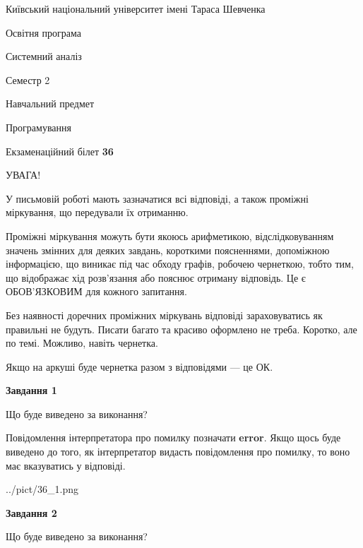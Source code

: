 \documentclass[12pt, ukrainian]{article}
\begin{document}
{{\begin {small}\par
{ \center  Київський національний університет імені Тараса Шевченка \par}
{\parbox {5 cm}{Освітня програма \hfill}{\parbox {7 cm}{Системний аналіз \hfill}}\parbox {6 cm}{\hfill Семестр 2}}\par
{\parbox {5 cm} {Навчальний предмет \hfill}\parbox {7 cm}{Програмування \hfill}\parbox {6cm}{\hfill}\par}\vspace{-7pt} \end{small}}{\center Екзаменаційний білет \No \textbf
{ 36 }\par}}
{
\begin {large}
УВАГА!

У письмовій роботі мають зазначатися всі відповіді, а також проміжні міркування, що передували їх отриманню.

Проміжні міркування можуть бути якоюсь арифметикою, відслідковуванням зна\-чень змінних для деяких завдань,
короткими поясненнями, допоміжною інформацією, що виникає під час обходу графів, робочею чернеткою,
тобто тим, що відображає хід розв’язання або пояснює отриману відповідь.
Це є ОБОВ’ЯЗКОВИМ для кожного запитання.

Без наявності доречних проміжних міркувань відповіді зараховуватись як правиль\-ні не будуть.
Писати багато та красиво оформлено не треба. Коротко, але по темі. Можли\-во, навіть чернетка.

Якщо на аркуші буде чернетка разом з відповідями --- це ОК.

\newpage

{\begin {center}\textbf{Завдання 1}\end {center}}\par
Що буде виведено за виконання?

Повідомлення інтерпретатора про помилку позначати \textbf{error}.
Якщо щось буде виведено до того, як інтерпретатор видасть повідомлення про помилку, 
то воно має вказуватись у відповіді. \par


\begin{center}
	{../pict/36_1.png}
\end{center}
\newpage

{\begin {center}\textbf{Завдання 2}\end {center}}\par
Що буде виведено за виконання?


\end{large}}
\end{document}
